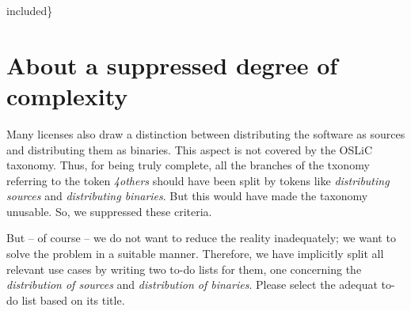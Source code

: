 \begin{tiny}
{{{{{{{{{{{{{{                                  \hspace*{0.5em}included\}}}}
                               }
                             }
                           }
                 }
              }             
            }
          }
        }
      }      
    }
  }
\end{tiny}

\section{About a suppressed degree of complexity}
\label{sec:SourceBinaryDifference}
Many licenses also draw a distinction between distributing the software as
sources and distributing them as binaries. This aspect is not covered by the
OSLiC taxonomy. Thus, for being truly complete, all the branches of the txonomy
referring to the token \emph{4others} should have been split by tokens like
\emph{distributing sources} and \emph{distributing binaries}. But this would
have made the taxonomy unusable. So, we suppressed these criteria.

But -- of course -- we do not want to reduce the reality inadequately; we want
to solve the problem in a suitable manner. Therefore, we have implicitly split
all relevant use cases by writing two to-do lists for them, one concerning the
\emph{distribution of sources} and \emph{distribution of binaries}. Please
select the adequat to-do list based on its title.

%
